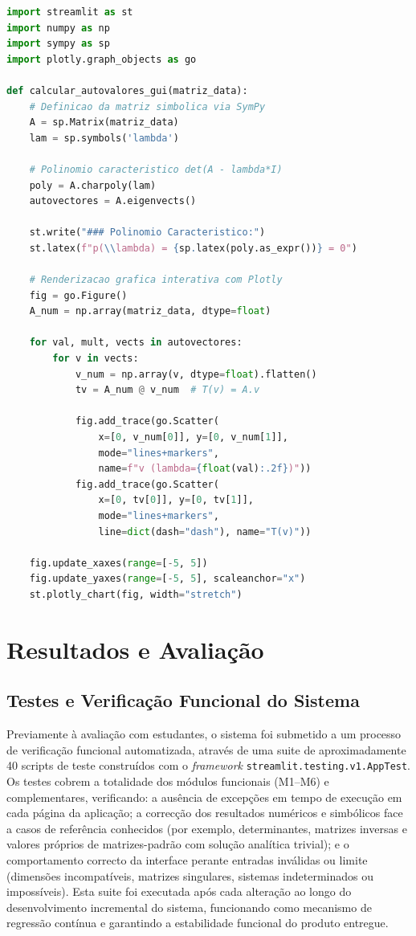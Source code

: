 \documentclass[conference]{IEEEtran}
\begin{document}
\begin{lstlisting}[language=Python, caption={Trecho de código Python do núcleo do Módulo M6 no LIDAL.}, label={lst:autovalores}]
import streamlit as st
import numpy as np
import sympy as sp
import plotly.graph_objects as go

def calcular_autovalores_gui(matriz_data):
    # Definicao da matriz simbolica via SymPy
    A = sp.Matrix(matriz_data)
    lam = sp.symbols('lambda')

    # Polinomio caracteristico det(A - lambda*I)
    poly = A.charpoly(lam)
    autovectores = A.eigenvects()

    st.write("### Polinomio Caracteristico:")
    st.latex(f"p(\\lambda) = {sp.latex(poly.as_expr())} = 0")

    # Renderizacao grafica interativa com Plotly
    fig = go.Figure()
    A_num = np.array(matriz_data, dtype=float)

    for val, mult, vects in autovectores:
        for v in vects:
            v_num = np.array(v, dtype=float).flatten()
            tv = A_num @ v_num  # T(v) = A.v

            fig.add_trace(go.Scatter(
                x=[0, v_num[0]], y=[0, v_num[1]],
                mode="lines+markers",
                name=f"v (lambda={float(val):.2f})"))
            fig.add_trace(go.Scatter(
                x=[0, tv[0]], y=[0, tv[1]],
                mode="lines+markers",
                line=dict(dash="dash"), name="T(v)"))

    fig.update_xaxes(range=[-5, 5])
    fig.update_yaxes(range=[-5, 5], scaleanchor="x")
    st.plotly_chart(fig, width="stretch")
\end{lstlisting}

\section{Resultados e Avaliação}

\subsection{Testes e Verificação Funcional do Sistema}
\label{sec:testes}

Previamente à avaliação com estudantes, o sistema foi submetido a um processo de verificação funcional automatizada, através de uma suite de aproximadamente 40 scripts de teste construídos com o \textit{framework} \texttt{streamlit.testing.v1.AppTest}. Os testes cobrem a totalidade dos módulos funcionais (M1--M6) e complementares, verificando: a ausência de excepções em tempo de execução em cada página da aplicação; a correcção dos resultados numéricos e simbólicos face a casos de referência conhecidos (por exemplo, determinantes, matrizes inversas e valores próprios de matrizes-padrão com solução analítica trivial); e o comportamento correcto da interface perante entradas inválidas ou limite (dimensões incompatíveis, matrizes singulares, sistemas indeterminados ou impossíveis). Esta suite foi executada após cada alteração ao longo do desenvolvimento incremental do sistema, funcionando como mecanismo de regressão contínua e garantindo a estabilidade funcional do produto entregue.
\end{document}
